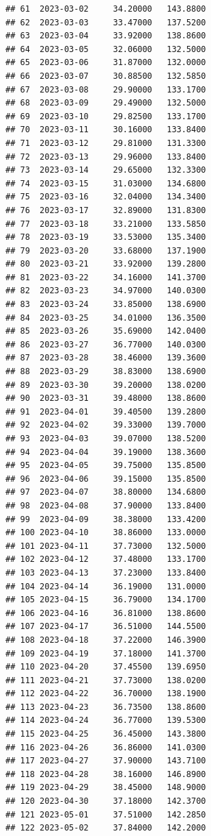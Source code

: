 \documentclass[
]{article}
\begin{document}
\begin{verbatim}
## 61  2023-03-02     34.20000   143.8800
## 62  2023-03-03     33.47000   137.5200
## 63  2023-03-04     33.92000   138.8600
## 64  2023-03-05     32.06000   132.5000
## 65  2023-03-06     31.87000   132.0000
## 66  2023-03-07     30.88500   132.5850
## 67  2023-03-08     29.90000   133.1700
## 68  2023-03-09     29.49000   132.5000
## 69  2023-03-10     29.82500   133.1700
## 70  2023-03-11     30.16000   133.8400
## 71  2023-03-12     29.81000   131.3300
## 72  2023-03-13     29.96000   133.8400
## 73  2023-03-14     29.65000   132.3300
## 74  2023-03-15     31.03000   134.6800
## 75  2023-03-16     32.04000   134.3400
## 76  2023-03-17     32.89000   131.8300
## 77  2023-03-18     33.21000   133.5850
## 78  2023-03-19     33.53000   135.3400
## 79  2023-03-20     33.68000   137.1900
## 80  2023-03-21     33.92000   139.2800
## 81  2023-03-22     34.16000   141.3700
## 82  2023-03-23     34.97000   140.0300
## 83  2023-03-24     33.85000   138.6900
## 84  2023-03-25     34.01000   136.3500
## 85  2023-03-26     35.69000   142.0400
## 86  2023-03-27     36.77000   140.0300
## 87  2023-03-28     38.46000   139.3600
## 88  2023-03-29     38.83000   138.6900
## 89  2023-03-30     39.20000   138.0200
## 90  2023-03-31     39.48000   138.8600
## 91  2023-04-01     39.40500   139.2800
## 92  2023-04-02     39.33000   139.7000
## 93  2023-04-03     39.07000   138.5200
## 94  2023-04-04     39.19000   138.3600
## 95  2023-04-05     39.75000   135.8500
## 96  2023-04-06     39.15000   135.8500
## 97  2023-04-07     38.80000   134.6800
## 98  2023-04-08     37.90000   133.8400
## 99  2023-04-09     38.38000   133.4200
## 100 2023-04-10     38.86000   133.0000
## 101 2023-04-11     37.73000   132.5000
## 102 2023-04-12     37.48000   133.1700
## 103 2023-04-13     37.23000   133.8400
## 104 2023-04-14     36.19000   131.0000
## 105 2023-04-15     36.79000   134.1700
## 106 2023-04-16     36.81000   138.8600
## 107 2023-04-17     36.51000   144.5500
## 108 2023-04-18     37.22000   146.3900
## 109 2023-04-19     37.18000   141.3700
## 110 2023-04-20     37.45500   139.6950
## 111 2023-04-21     37.73000   138.0200
## 112 2023-04-22     36.70000   138.1900
## 113 2023-04-23     36.73500   138.8600
## 114 2023-04-24     36.77000   139.5300
## 115 2023-04-25     36.45000   143.3800
## 116 2023-04-26     36.86000   141.0300
## 117 2023-04-27     37.90000   143.7100
## 118 2023-04-28     38.16000   146.8900
## 119 2023-04-29     38.45000   148.9000
## 120 2023-04-30     37.18000   142.3700
## 121 2023-05-01     37.51000   142.2850
## 122 2023-05-02     37.84000   142.2000

\end{verbatim}
\end{document}
